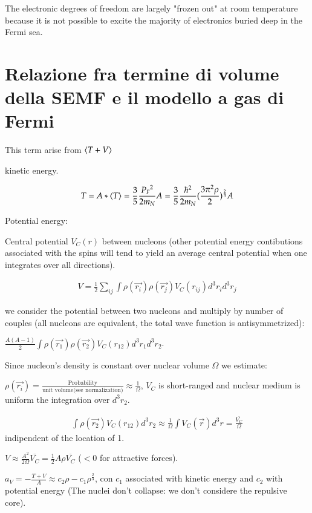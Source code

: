 \documentclass[main.tex]{subfiles}
\begin{document}
The electronic degrees of freedom are largely "frozen out" at room temperature because it is not possible to excite the majority of electronics buried deep in the Fermi sea.

\section{Relazione fra termine di volume della SEMF e il modello a gas di Fermi}

This term arise from $\langle T+V \rangle$\\
\begin{itemize*}
\item kinetic energy.

\begin{align*}
T=A*\langle T \rangle=\frac{3}{5}\frac{{P_F}^2}{2m_N}A=\frac{3}{5}\frac{\hbar^2}{2m_N}(\frac{3\pi^2\rho}{2})^{\frac{2}{3}}A
\end{align*}


\item Potential energy:

Central potential $V_C(r)$ between nucleons (other potential energy contibutions associated with the spins will tend to yield an average central potential when one integrates over all directions).

\begin{align*}
V=\frac{1}{2}\sum_{ij}\int\rho(\vec{r_i})\rho(\vec{r_j})V_C(r_{ij})d^3r_id^3r_j
\end{align*}

we consider the potential between two nucleons and multiply by number of couples (all nucleons are equivalent, the total wave function is antisymmetrized):

$\frac{A(A-1)}{2}\int\rho(\vec{r_1})\rho(\vec{r_2})V_C(r_{12})d^3r_1d^3r_2$.

Since nucleon's density is constant over nuclear volume  $\Omega$ we estimate:

$\rho(\vec{r_i})=\frac{\text{Probability}}{\text{unit volume(see normalization)}}\approx\frac{1}{\Omega}$, $V_C$ is short-ranged and nuclear medium is uniform  the integration over $d^3r_2$.

\begin{align*}
\int\rho(\vec{r_2})V_C(r_{12})d^3r_2\approx\frac{1}{\Omega}\int V_C(\vec{r})d^3r=\frac{\overline{V_C}}{\Omega}
\end{align*}
indipendent of the location of 1.

 $V\approx\frac{A^2}{2\Omega}\overline{V_C}=\frac{1}{2}A\rho\overline{V_C} $ ($<0$ for attractive forces).
 
$a_V=-\frac{T+V}{A}\approx c_2\rho-c_1\rho^{\frac{2}{3}}$, con $c_1$ associated with kinetic energy and $c_2$ with potential energy (The nuclei don't collapse: we don't considere the repulsive core).
\end{itemize*}
\end{document}

